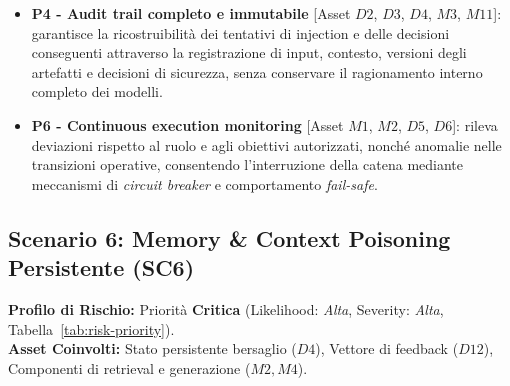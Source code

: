 \documentclass[11pt,a4paper]{article}
\begin{document}
\begin{itemize}
    \item \textbf{P4 - Audit trail completo e immutabile} [Asset $D2$, $D3$, $D4$, $M3$, $M11$]:
        garantisce la ricostruibilità dei tentativi di injection e delle
    decisioni conseguenti attraverso la registrazione di input,
    contesto, versioni degli artefatti e decisioni di sicurezza, senza
    conservare il ragionamento interno completo dei modelli.

    \item \textbf{P6 - Continuous execution monitoring} [Asset $M1$, $M2$, $D5$, $D6$]:
        rileva deviazioni rispetto al ruolo e agli obiettivi autorizzati,
    nonché anomalie nelle transizioni operative, consentendo
    l'interruzione della catena mediante meccanismi di
    \emph{circuit breaker} e comportamento \emph{fail-safe}.
\end{itemize}

\subsection{Scenario 6: Memory \& Context Poisoning Persistente (SC6)}
\label{sec:sc6}

\noindent\textbf{Profilo di Rischio:} Priorità \textbf{Critica} (Likelihood: \emph{Alta}, Severity: \emph{Alta}, Tabella~\ref{tab:risk-priority}).\\
\textbf{Asset Coinvolti:} Stato persistente bersaglio ($D4$), Vettore di feedback ($D12$), Componenti di retrieval e generazione ($M2, M4$).
\end{document}
